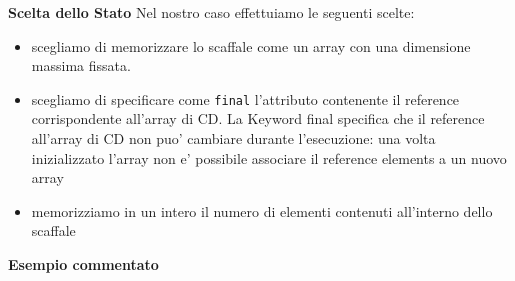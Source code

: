 \documentclass{article}
\begin{document}
\textbf{Scelta dello Stato}
Nel nostro caso effettuiamo le seguenti scelte:
\begin{itemize}
\item scegliamo di memorizzare lo scaffale come un array con una dimensione massima fissata.
\item scegliamo di specificare come \texttt{final} l'attributo contenente il reference corrispondente all'array di CD. La Keyword final specifica che il reference all'array di CD non puo' cambiare durante l'esecuzione: una volta inizializzato l'array non e' possibile associare il reference elements a un nuovo array 
\item memorizziamo in un intero il numero di elementi contenuti all'interno dello scaffale
\end{itemize}


\textbf{Esempio commentato}
\end{document}
